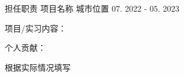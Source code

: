 

\begin{cventries}

  \cventry
    {担任职责} %
    {项目名称} %
    {城市位置} %
    {07. 2022 - 05. 2023} %
    {
      \begin{cvitems} %
        \item {项目/实习内容：}
        \item {个人贡献：}
        \item {根据实际情况填写}
        \item {}
        \item {}
        \item {}
      \end{cvitems}
    }






\end{cventries}
